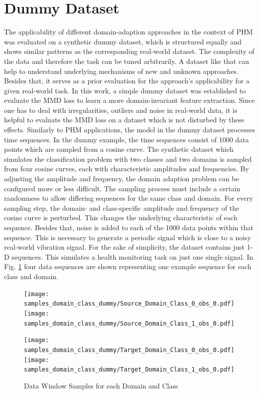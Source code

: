 \section{Dummy Dataset}
The applicability of different domain-adaption approaches in the context of PHM was evaluated on a synthetic dummy dataset, which is structured equally and shows similar patterns as the corresponding real-world dataset. The complexity of the data and therefore the task can be tuned arbitrarily. A dataset like that can help to understand underlying mechanisms of new and unknown approaches. Besides that, it serves as a prior evaluation for the approach's applicability for a given real-world task. In this work, a simple dummy dataset was established to evaluate the MMD loss to learn a more domain-invariant feature extraction. Since one has to deal with irregularities, outliers and noise in real-world data, it is helpful to evaluate the MMD loss on a dataset which is not disturbed by these effects. Similarly to PHM applications, the model in the dummy dataset processes time sequences. In the dummy example, the time sequences consist of 1000 data points which are sampled from a cosine  curve. The synthetic dataset which simulates the classification problem with two classes and two domains is sampled from four cosine  curves, each with characteristic amplitudes and frequencies. By adjusting the amplitude and frequency, the domain adaption problem can be configured more or less difficult. The sampling process must include a certain randomness to allow differing sequences for the same class and domain. For every sampling step, the domain- and class-specific amplitude and frequency of the cosine  curve is perturbed. This changes the underlying characteristic of each sequence. Besides that, noise is added to each of the 1000 data points within that sequence. This is necessary to generate a periodic signal which is close to a noisy real-world vibration signal. For the sake of simplicity, the dataset contains just 1-D sequences. This simulates a health monitoring task on just one single signal. In Fig. \ref{fig:samples_domain_class_dummy} four data sequences are shown representing one example sequence for each class and domain. 

\begin{figure}[H]
  \centering
  \texttt{[image: samples\_domain\_class\_dummy/Source\_Domain\_Class\_0\_obs\_0.pdf]}
  \hspace{.3cm}
  \texttt{[image: samples\_domain\_class\_dummy/Source\_Domain\_Class\_1\_obs\_0.pdf]}

  \vspace{.3cm}

  \texttt{[image: samples\_domain\_class\_dummy/Target\_Domain\_Class\_0\_obs\_0.pdf]}
  \hspace{.3cm}
  \texttt{[image: samples\_domain\_class\_dummy/Target\_Domain\_Class\_1\_obs\_0.pdf]}

  \caption{Data Window Samples for each Domain and Class}
  \label{fig:samples_domain_class_dummy}
\end{figure}


